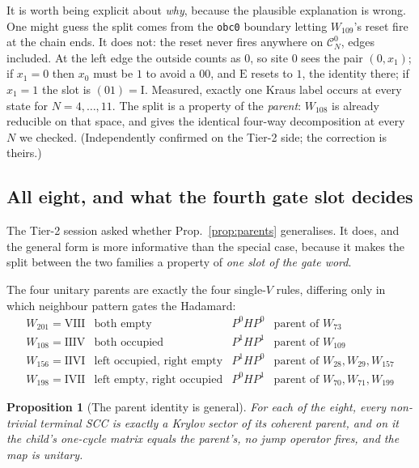\documentclass[11pt]{article}
\newcommand{\rt}[1]{\texttt{#1}}
\theoremstyle{plain}
\newtheorem{proposition}{Proposition}
\theoremstyle{remark}
\begin{document}
It is worth being explicit about \emph{why}, because the plausible explanation
is wrong. One might guess the split comes from the \rt{obc0} boundary letting
$W_{109}$'s reset fire at the chain ends. It does not: the reset never fires
anywhere on $\mathcal{C}^0_N$, edges included. At the left edge the outside
counts as $0$, so site $0$ sees the pair $(0, x_1)$; if $x_1 = 0$ then $x_0$
must be $1$ to avoid a $00$, and $\mathrm{E}$ resets to $1$, the identity there;
if $x_1 = 1$ the slot is $(01) = \mathrm{I}$. Measured, exactly one Kraus label
occurs at every state for $N = 4,\dots,11$. The split is a property of the
\emph{parent}: $W_{108}$ is already reducible on that space, and gives the
identical four-way decomposition at every $N$ we checked. (Independently
confirmed on the Tier-2 side; the correction is theirs.)

\subsection{All eight, and what the fourth gate slot decides}
\label{sec:allparents}

The Tier-2 session asked whether Prop.~\ref{prop:parents} generalises. It does,
and the general form is more informative than the special case, because it makes
the split between the two families a property of \emph{one slot of the gate
word}.

The four unitary parents are exactly the four single-$V$ rules, differing only in
which neighbour pattern gates the Hadamard:
\[
  \begin{array}{llll}
  W_{201} = \mathrm{VIII} & \text{both empty} & P^0HP^0 &
    \text{parent of } W_{73}\\
  W_{108} = \mathrm{IIIV} & \text{both occupied} & P^1HP^1 &
    \text{parent of } W_{109}\\
  W_{156} = \mathrm{IIVI} & \text{left occupied, right empty} & P^1HP^0 &
    \text{parent of } W_{28}, W_{29}, W_{157}\\
  W_{198} = \mathrm{IVII} & \text{left empty, right occupied} & P^0HP^1 &
    \text{parent of } W_{70}, W_{71}, W_{199}
  \end{array}
\]

\begin{proposition}[The parent identity is general]
\label{prop:allparents}
For each of the eight, every non-trivial terminal SCC is exactly a Krylov sector
of its coherent parent, and on it the child's one-cycle matrix equals the
parent's, no jump operator fires, and the map is unitary.
\end{proposition}
\end{document}
